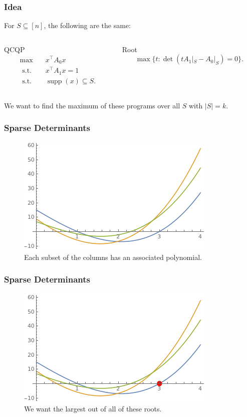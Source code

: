 \documentclass{beamer}
\DeclareMathOperator*{\supp}{supp}
\newcommand{\st}{{\text{ s.t. }}}
\begin{document}
\begin{frame}
    \frametitle{Idea}
    For $S \subseteq [n]$, the following are the same:
    \begin{columns}
        \begin{column}{0.48\textwidth}
            \begin{block}{QCQP}
            \begin{equation*}
                \begin{aligned}
                    \max\quad & x^{\intercal}A_0x\\
                    \st & x^{\intercal}A_1x = 1\\
                    \st & \supp(x) \subseteq S.
                \end{aligned}
            \end{equation*}
            \end{block}
        \end{column}
        \begin{column}{0.48\textwidth}
            \begin{block}{Root}
            \[
                \max \{t : \det(tA_1|_S - A_0|_S) = 0\}.
            \]
            \end{block}
        \end{column}
    \end{columns}
    We want to find the maximum of these programs over all $S$ with $|S| = k$.
\end{frame}
\begin{frame}
    \frametitle{Sparse Determinants}
    \begin{figure}[h]
        \centering
        \includegraphics[width=0.6\linewidth]{univariates.png}
        \caption{Each subset of the columns has an associated polynomial.}%
        \label{fig:variety}
    \end{figure}
\end{frame}
\begin{frame}
    \frametitle{Sparse Determinants}
    \begin{figure}[h]
        \centering
        \includegraphics[width=0.6\linewidth]{univariates_root.png}
        \caption{We want the largest out of all of these roots.}%
        \label{fig:variety}
    \end{figure}
\end{frame}
\end{document}
